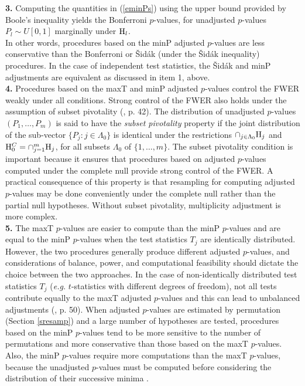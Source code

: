 \documentclass[11pt]{article}
\begin{document}
{\bf 3.} Computing the quantities in (\ref{eminPs}) using the upper
bound provided by Boole's inequality yields the Bonferroni $p$-values,
for unadjusted $p$-values
$P_l \sim U[0,1]$ marginally under ${\rm H}_l$.\\

In other words, procedures based on the minP adjusted $p$-values are less conservative than the Bonferroni or \v{S}id\'{a}k (under the \v{S}id\'{a}k inequality) procedures. In the case of independent test statistics, the \v{S}id\'{a}k and minP adjustments are equivalent as discussed in item 1, above.\\

{\bf 4.} Procedures based on the maxT and minP adjusted $p$-values control the FWER weakly under all conditions. Strong control of the FWER also holds under the assumption of subset pivotality (\cite{Westfall&Young93}, p. 42). The distribution of unadjusted $p$-values $(P_1, \ldots, P_m)$ is said to have the {\it subset pivotality} property if the joint distribution of the sub-vector $\{P_j: j \in \Lambda_0\}$ is identical under the restrictions $\cap_{j \in \Lambda_0} {\rm H}_j$ and ${\rm H}_0^C = \cap_{j=1}^m {\rm H}_j$, for all subsets $\Lambda_0$ of $\{1, \ldots, m\}$. The subset pivotality condition is important because it ensures that procedures based on adjusted $p$-values computed under the complete null provide strong control of the FWER. A practical consequence of this property is that resampling for computing adjusted $p$-values may be done conveniently under the complete null rather than the partial null hypotheses. Without subset pivotality, multiplicity adjustment is more complex.\\

{\bf 5.} The maxT $p$-values are easier to compute than the minP $p$-values and are equal to the minP $p$-values when the test statistics $T_j$ are identically distributed. However, the two procedures generally produce different adjusted $p$-values, and considerations of balance, power, and computational feasibility should dictate the choice between the two approaches. In the case of
  non-identically distributed test statistics $T_j$ ({\it e.g.}
  $t$-statistics with different degrees of freedom), not all tests
  contribute equally to the maxT adjusted $p$-values and this can lead
  to unbalanced adjustments (\cite{Beran88},
  \cite{Westfall&Young93} p. 50). When adjusted $p$-values are estimated by permutation
  (Section \ref{sresamp}) and a large number of hypotheses are tested,
  procedures based on the minP $p$-values tend to be more sensitive to
  the number of permutations and more conservative than those based on
  the maxT $p$-values. Also, the minP $p$-values require more
  computations than the maxT $p$-values, because the unadjusted
  $p$-values must be computed before considering the distribution of
  their successive minima \citep{Ge&Dudoit}. 
\end{document}
